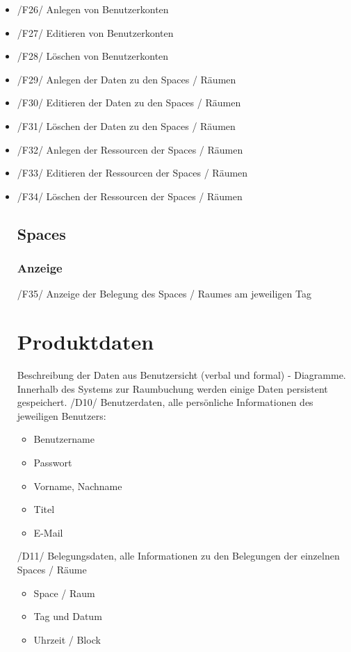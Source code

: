 \documentclass[a4paper,report,headsepline]{scrreprt}
\begin{document}
\begin{itemize}
\item /F26/ Anlegen von Benutzerkonten
\item /F27/ Editieren von Benutzerkonten
\item /F28/ Löschen von Benutzerkonten
\item /F29/ Anlegen der Daten zu den Spaces / Räumen
\item /F30/ Editieren der Daten zu den Spaces / Räumen
\item /F31/ Löschen der Daten zu den Spaces / Räumen
\item /F32/ Anlegen der Ressourcen der Spaces / Räumen
\item /F33/ Editieren der Ressourcen der Spaces / Räumen
\item /F34/ Löschen der Ressourcen der Spaces / Räumen

\section{Spaces}

\subsection{Anzeige}
/F35/ Anzeige der Belegung des Spaces / Raumes am jeweiligen Tag

\chapter{Produktdaten}
Beschreibung der Daten aus Benutzersicht (verbal und formal) - Diagramme.
Innerhalb des Systems zur Raumbuchung werden einige Daten persistent gespeichert.
/D10/ Benutzerdaten, alle persönliche Informationen des jeweiligen Benutzers:
\begin{itemize}
\item Benutzername
\item Passwort
\item Vorname, Nachname
\item Titel
\item E-Mail
\end{itemize}

/D11/ Belegungsdaten, alle Informationen zu den Belegungen der einzelnen Spaces / Räume

\begin{itemize}
\item Space / Raum
\item Tag und Datum
\item Uhrzeit / Block
\end{itemize}
\end{itemize}
\end{document}
